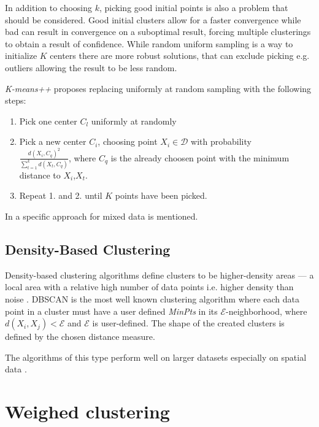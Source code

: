 \documentclass[../report.tex]{subfiles}
\begin{document}
In addition to choosing $k$, picking good initial points is also a problem that should be considered. Good initial clusters allow for a faster convergence while bad can result in convergence on a suboptimal result\cite{Arthur2006, Jia2018}, forcing multiple clusterings to obtain a result of confidence. While random uniform sampling is a way to initialize $K$ centers there are more robust solutions, that can exclude picking e.g. outliers allowing the result to be less random. 

\textit{K-means++}\cite{Arthur2006} proposes replacing uniformly at random sampling with the following steps:

\begin{enumerate}
  \item Pick one center $C_l$ uniformly at randomly
  \item Pick a new center $C_i$, choosing point $X_i \in \mathcal{D}$ with probability \\ $\frac{d(X_i,C_q)^2}{\sum_{t=1}^{k}{d(X_t,C_q)}}$, where $C_q$ is the already choosen point with the minimum distance to $X_i$,$X_t$.
  \item Repeat 1. and 2. until $K$ points have been picked.
\end{enumerate}

In \cite{Jia2018} a specific approach for mixed data is mentioned.




\subsection{Density-Based Clustering}
\label{sub:density}
Density-based clustering algorithms define clusters to be higher-density areas --- a local area with a relative high number of data points i.e. higher density than noise  \cite{Ester1996, huang2005automated, Xu2015,Jain1999}. DBSCAN \cite{Ester1996} is the most well known clustering algorithm where each data point in a cluster must have a user defined \textit{MinPts} in its $\mathcal{E}$-neighborhood, where $d(X_i,X_j) < \mathcal{E}$ and $\mathcal{E}$ is user-defined. The shape of the created clusters is defined by the chosen distance measure.

The algorithms of this type perform well on larger datasets especially on spatial data \cite{Ester1996}.

\section{Weighed clustering}
\label{ch:weighed}
\end{document}
